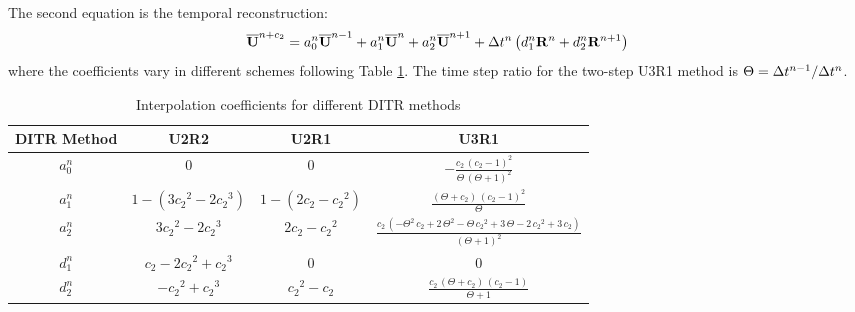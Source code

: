\documentclass[preprint,12pt]{elsarticle}
\begin{document}
The second equation is the temporal reconstruction:
\begin{equation}
    \label{eq:TRSum}
    \overline{\mathbf{U}}^{n+c_2}  =
    a^n_0\overline{\mathbf{U}}^{n - 1} +
    a^n_1\overline{\mathbf{U}}^{n} +
    a^n_2\overline{\mathbf{U}}^{n + 1}
    +
    \mathrm\Delta t^n
    \left(
    d^n_1\mathbf{R}^{n} +
    d^n_2\mathbf{R}^{n + 1}
    \right)
\end{equation}
where the coefficients vary in different schemes
following Table \ref{tab:inter0Tab}.
The time step ratio for the two-step U3R1 method is
$\Theta = \mathrm\Delta t^{n-1} / \mathrm\Delta t^{n}$.

\begin{table}[htbp]
    \centering
    \footnotesize
    \begin{tabular}{|c|c|c|c|}
        \hline
        DITR Method & U2R2                          & U2R1                 & U3R1                                                                                                                                   \\
        \hline
        $a^n_0$     & 0                             & 0                    & $-\frac{c_{2}\,{\left(c_{2}-1\right)}^2}{\Theta\,{\left(\Theta+1\right)}^2}$                                                           \\
        \hline
        $a^n_1$     & $1-(3{c_2}^2 - 2 {c_2}^3)$    & $1-(2c_2 - {c_2}^2)$ & $\frac{\left(\Theta+c_{2}\right)\,{\left(c_{2}-1\right)}^2}{\Theta}$                                                                   \\
        \hline
        $a^n_2$     & $3{c_2}^2 - 2 {c_2}^3$        & $2c_2 - {c_2}^2$     & $\frac{c_{2}\,\left(-\Theta^2\,c_{2}+2\,\Theta^2-\Theta\,{c_{2}}^2+3\,\Theta-2\,{c_{2}}^2+3\,c_{2}\right)}{{\left(\Theta+1\right)}^2}$ \\
        \hline
        $d^n_1$     & ${c_2} - 2 {c_2}^2 + {c_2}^3$ & 0                    & 0                                                                                                                                      \\
        \hline
        $d^n_2$     & $- {c_2}^2 + {c_2}^3$         & ${c_2}^2 - {c_2}$    & $\frac{c_{2}\,\left(\Theta+c_{2}\right)\,\left(c_{2}-1\right)}{\Theta+1}$                                                              \\
        \hline
    \end{tabular}
    \caption{Interpolation coefficients for different DITR methods}
    \label{tab:inter0Tab}
\end{table}
\end{document}
